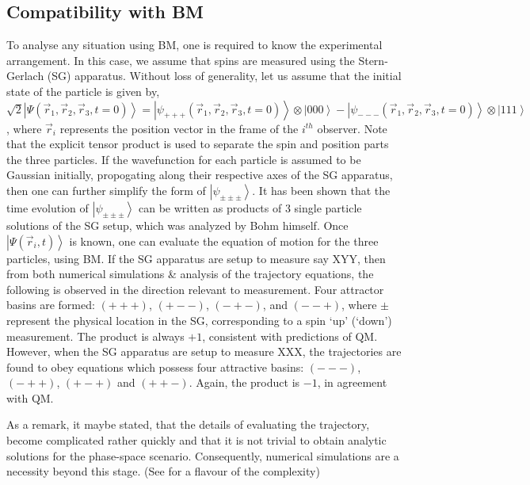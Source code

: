 \subsection{Compatibility with BM}

To analyse any situation using BM, one is required to know the experimental
arrangement. In this case, we assume that spins are measured using
the Stern-Gerlach (SG) apparatus. Without loss of generality, let
us assume that the initial state of the particle is given by, $\sqrt{2}\left|\Psi(\vec{r}_{1},\vec{r}_{2},\vec{r}_{3},t=0)\right\rangle =\left|\psi_{+++}(\vec{r}_{1},\vec{r}_{2},\vec{r}_{3},t=0)\right\rangle \otimes\left|000\right\rangle -\left|\psi_{---}(\vec{r}_{1},\vec{r}_{2},\vec{r}_{3},t=0)\right\rangle \otimes\left|111\right\rangle $,
where $\vec{r}_{i}$ represents the position vector in the frame of
the $i^{th}$ observer. Note that the explicit tensor product is used
to separate the spin and position parts the three particles. If the
wavefunction for each particle is assumed to be Gaussian initially,
propogating along their respective axes of the SG apparatus, then
one can further simplify the form of $\left|\psi_{\pm\pm\pm}\right\rangle $.
It has been shown \cite{BohmGHZetc} that the time evolution of $\left|\psi_{\pm\pm\pm}\right\rangle $
can be written as products of 3 single particle solutions of the SG
setup, which was analyzed by Bohm himself. Once $\left|\Psi(\vec{r}_{i},t)\right\rangle $
is known, one can evaluate the equation of motion for the three particles,
using BM. If the SG apparatus are setup to measure say XYY, then from
both numerical simulations \& analysis of the trajectory equations,
the following is observed in the direction relevant to measurement.
Four attractor basins are formed: $(+++)$, $(+--)$, $(-+-)$, and
$(--+)$, where $\pm$ represent the physical location in the SG,
corresponding to a spin `up' (`down') measurement. The product is
always $+1$, consistent with predictions of QM. However, when the
SG apparatus are setup to measure XXX, the trajectories are found
to obey equations which possess four attractive basins: $(---)$,
$(-++)$, $(+-+)$ and $(++-)$. Again, the product is $-1$, in agreement
with QM. 

As a remark, it maybe stated, that the details of evaluating the trajectory,
become complicated rather quickly and that it is not trivial to obtain
analytic solutions for the phase-space scenario. Consequently, numerical
simulations are a necessity beyond this stage. (See \cite{BohmGHZetc}
for a flavour of the complexity)

